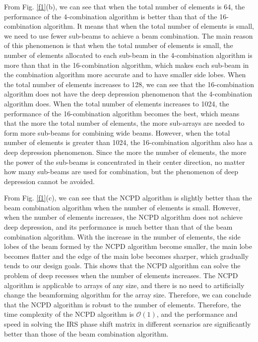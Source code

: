 \documentclass[12pt,draftclsnofoot,onecolumn]{IEEEtran}
\begin{document}
	From Fig. \ref{f1}(b), we can see that when the total number of elements is 64, the performance of the 4-combination algorithm is better than that of the 16-combination algorithm. It means that when the total number of elements is small, we need to use fewer sub-beams to achieve a beam combination. The main reason of this phenomenon is that when the total number of elements is small, the number of elements allocated to each sub-beam in the 4-combination algorithm is more than that in the 16-combination algorithm, which makes each sub-beam in the combination algorithm  more accurate and to have  smaller side lobes. When the total number of elements increases to 128, we can see that the 16-combination algorithm does not have the deep depression phenomenon that the 4-combination algorithm does. When the total number of elements increases to 1024, the performance of the 16-combination algorithm becomes the best, which means that the more the total number of elements, the more sub-arrays are needed to form more sub-beams for combining  wide beams. However, when the total number of elements is greater than 1024, the 16-combination algorithm also has a deep depression phenomenon. Since the more the number of elements, the more the power of the sub-beams is concentrated in their center direction,  no matter how many sub-beams are used for combination, but the phenomenon of deep depression cannot be avoided.
	
	From Fig. \ref{f1}(c), we can see that the NCPD algorithm is slightly better than the beam combination algorithm when the number of elements is small. However, when the number of elements increases, the NCPD algorithm does not achieve deep depression, and its performance is much better than that of the beam combination algorithm. With the increase in the number of elements, the side lobes of the beam formed by the NCPD algorithm become smaller, the main lobe becomes flatter and the edge of the main lobe becomes sharper, which gradually tends to our design goals. This shows that the NCPD algorithm can solve the problem of deep recesses when the number of elements increases. The NCPD algorithm is applicable to arrays of any size, and there is no need to artificially change the beamforming algorithm for the array size. Therefore, we can conclude that the NCPD algorithm is robust to the number of elements. Therefore, the time complexity of the NCPD algorithm is $\mathcal{O}(1)$, and the performance and speed in solving the IRS phase shift matrix in different scenarios are significantly better than those of the beam combination algorithm.
	
\end{document}
